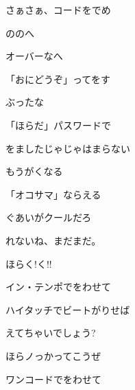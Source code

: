 \documentclass[a4paper,tate,twocolumn,12pt]{ltjtarticle}
\begin{document}
\begin{flushleft}
\vspace{2em}

\noindent\begin{minipage}{\linewidth}
さぁさぁ、コードをでめ

ののへ

オーバーなへ
\end{minipage}

\vspace{2em}

\noindent\begin{minipage}{\linewidth}
「おにどうぞ」ってをす

ぶったな

「ほらだ」パスワードで

をましたじゃじゃはまらない

もうがくなる

「オコサマ」ならえる

ぐあいがクールだろ

れないね、まだまだ。

ほらく!く!!
\end{minipage}

\vspace{2em}

\noindent\begin{minipage}{\linewidth}
イン・テンポでをわせて

ハイタッチでビートがりせば
\end{minipage}

\vspace{2em}

\noindent\begin{minipage}{\linewidth}
えてちゃいでしょう?

ほらノっかってこうぜ
\end{minipage}

\vspace{2em}

\noindent\begin{minipage}{\linewidth}
ワンコードでをわせて


\end{minipage}
\end{flushleft}
\end{document}
